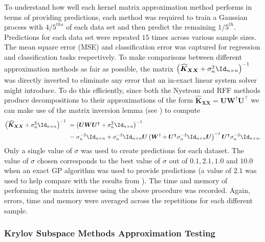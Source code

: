 To understand how well each kernel matrix approximation method performs in terms of providing predictions, each method was required to train a Gaussian process with ${4/5}^{ths}$ of each data set and then predict the remaining ${1/5}^{th}$. Predictions for each data set were repeated $15$ times across various sample sizes. The mean square error (MSE) and classification error was captured for regression and classification tasks respectively. To make comparisons between different approximation methods as fair as possible, the matrix $\left( \widehat{\bm{K}}_{\bm{XX}} + \sigma_n^2 \Id_{n \times n} \right)^{-1}$ was directly inverted to eliminate any error that an in-exact linear system solver might introduce. To do this efficiently, since both the Nystrom and RFF methods produce decompositions to their approximations of the form $\widehat{\bm{K}}_{\bm{XX}} = \bm{U} \bm{W}^{\dagger} \bm{U}^{\intercal}$ we can make use of the matrix inversion lemma (see ) to compute
\begin{align*}
    \left( \widehat{\bm{K}}_{\bm{XX}} + \sigma_n^2 \Id_{n \times n} \right)^{-1} \
     & = \left( \bm{U} \bm{W} \bm{U}^{\intercal} + \sigma_n^2 \Id_{n \times n} \right)^{-1}                                                                                                                                        \\
     & = \sigma_n^{-2} \Id_{n \times n} + \sigma_n^{-2} \Id_{n \times n} \bm{U} \left( \bm{W}^{\dagger} + \bm{U}^{\intercal} \sigma_n^{-2} \Id_{n \times n} \bm{U} \right)^{-1} \bm{U}^{\intercal} \sigma_n^{-2} \Id_{n \times n}.
\end{align*}
Only a single value of $\sigma$ was used to create predictions for each dataset. The value of $\sigma$ chosen corresponds to the best value of $\sigma$ out of $0.1,2.1,1.0$ and $10.0$ when an exact GP algorithm was used to provide predictions (a value of $2.1$ was used to help compare with the results from \cite{JMLR:v6:drineas05a}). The time and memory of performing the matrix inverse using the above procedure was recorded. Again, errors, time and memory were averaged across the repetitions for each different sample.

\subsubsection{Krylov Subspace Methods Approximation Testing}\label{Section5.2.2}

